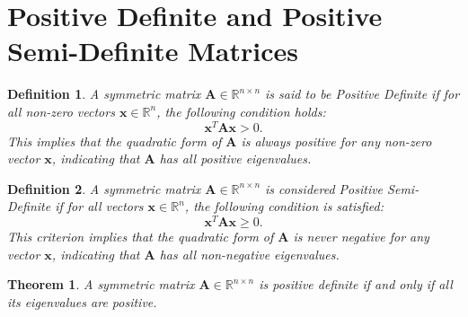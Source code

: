 \documentclass[11pt]{book} %
\newtheorem{theorem}{Theorem}[section]
\newtheorem{definition}{Definition}[section]
\begin{document}
\section{Positive Definite and Positive Semi-Definite Matrices}


\begin{definition}
A symmetric matrix \(\mathbf{A} \in \mathbb{R}^{n \times n}\) is said to be \textit{Positive Definite} if for all non-zero vectors \(\mathbf{x} \in \mathbb{R}^n\), the following condition holds:
\begin{equation}
\mathbf{x}^T \mathbf{A} \mathbf{x} > 0.
\end{equation}
This implies that the quadratic form of \(\mathbf{A}\) is always positive for any non-zero vector \(\mathbf{x}\), indicating that \(\mathbf{A}\) has all positive eigenvalues.
\end{definition}

\begin{definition}
A symmetric matrix \(\mathbf{A} \in \mathbb{R}^{n \times n}\) is considered \textit{Positive Semi-Definite} if for all vectors \(\mathbf{x} \in \mathbb{R}^n\), the following condition is satisfied:
\begin{equation}
\mathbf{x}^T \mathbf{A} \mathbf{x} \geq 0.
\end{equation}
This criterion implies that the quadratic form of \(\mathbf{A}\) is never negative for any vector \(\mathbf{x}\), indicating that \(\mathbf{A}\) has all non-negative eigenvalues.
\end{definition}

\begin{theorem}
A symmetric matrix \(\mathbf{A} \in \mathbb{R}^{n \times n}\) is positive definite if and only if all its eigenvalues are positive.
\end{theorem}
\end{document}
